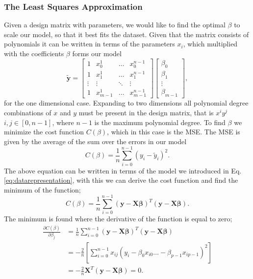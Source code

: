 \documentclass[%
 reprint,
nofootinbib,
 amsmath,amssymb,
 aps,
]{revtex4-2}
\begin{document}
\subsubsection{The Least Squares Approximation}
Given a design matrix with parameters, we would like to find the optimal $\beta$ to scale our model, so that it best fits the dataset. Given that the matrix consists of polynomials it can be written in terms of the parameters $x_i$, which multiplied with the coefficients $\beta$ forms our model
%
\begin{equation*}\label{eq:Model}
    \boldsymbol{\tilde{y}} = \begin{bmatrix}
    1& x_{0}^{1} & \dots & x_{0}^{n-1} \\
    1 & x_{1}^{1} & \dots   & x_{1}^{n-1}   \\
    \vdots & \vdots  & \ddots & \vdots \\
    1   & x_{m-1}^{1} & \dots  & x_{m-1}^{n-1}
    \end{bmatrix}
    \begin{bmatrix}
    \beta_{0} \\
    \beta_{1} \\
    \vdots \\
    \beta_{m-1}
    \end{bmatrix},
\end{equation*}
%
for the one dimensional case. Expanding to two dimensions all polynomial degree combinations of $x$ and $y$ must be present in the design matrix, that is $x^iy^j$ $i,j \in [0,n-1]$, where $n-1$ is the maximum polynomial degree. To find $\beta$ we minimize the cost function $C(\beta)$, which in this case is the MSE. The MSE is given by the average of the sum over the errors in our model
%
\begin{equation*}\label{eq:MSE}
    C(\beta) = \frac{1}{n} \sum_{i=0}^{n-1} (y_{i} - \tilde{y}_i )^{2}.
\end{equation*}
%
The above equation can be written in terms of the model we introduced in Eq. \eqref{eq:datarepresentation}, with this we can derive the cost function and find the minimum of the function;
%
\begin{equation*}
    C(\beta) = \frac{1}{n} \sum_{i=0}^{n-1} (\boldsymbol{y} - \boldsymbol{X}\boldsymbol{\beta})^T (\boldsymbol{y} - \boldsymbol{X}\boldsymbol{\beta}).
\end{equation*}
%
The minimum is found where the derivative of the function is equal to zero;
%
\begin{align*}
    \frac{\partial C(\beta)}{\partial \beta_j} &= \frac{1}{n} \sum_{i=0}^{n-1} (\boldsymbol{y} - \boldsymbol{X}\boldsymbol{\beta})^T (\boldsymbol{y} - \boldsymbol{X}\boldsymbol{\beta}) \\&
    = -\frac{2}{n}\left[\sum_{i=0}^{n-1}x_{ij}(y_{i} - \beta_{0}x_{i0} \dots -\beta_{p-1}x_{i p-1})^{2}\right] \\&
    = -\frac{2}{n} \boldsymbol{X}^T (\boldsymbol{y} -\boldsymbol{X}\boldsymbol{\beta}) = 0.
\end{align*}
\end{document}
